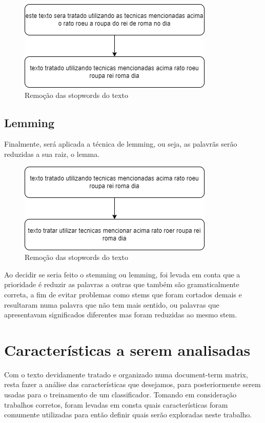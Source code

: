 \documentclass[conference]{IEEEtran}
\begin{document}
\begin{figure}[htbp]
\centerline{\includegraphics[scale=0.5]{figura2.png}}
\caption{Remoção das stopwords do texto}
\label{fig}
\end{figure}

\subsection{Lemming}
Finalmente, será aplicada a técnica de lemming, ou seja, as palavrãs serão reduzidas a sua raiz, o lemma. 

\begin{figure}[htbp]
\centerline{\includegraphics[scale=0.5]{figura3.png}}
\caption{Remoção das stopwords do texto}
\label{fig}
\end{figure}

Ao decidir se seria feito o stemming ou lemming, foi levada em conta que a prioridade é reduzir as palavras a outras que também são gramaticalmente correta, a fim de evitar problemas como stems que foram cortados demais e resultaram numa palavra que não tem mais sentido, ou palavras que apresentavam significados diferentes mas foram reduzidas ao mesmo stem. 

\section{Características a serem analisadas}

Com o texto devidamente tratado e organizado numa document-term matrix, resta fazer a análise das características que desejamos, para posteriormente serem usadas para o treinamento de um classificador. Tomando em consideração trabalhos corretos, foram levadas em consta quais características foram comumente utilizadas \cite{b7} para então definir quais serão exploradas neste trabalho.
\end{document}
